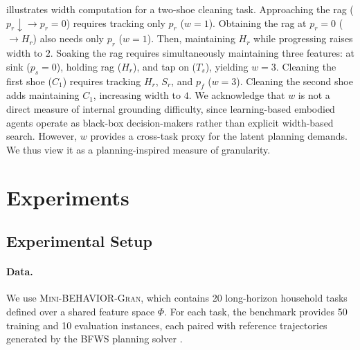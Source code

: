 \documentclass[11pt]{article}
\begin{document}


 illustrates width computation for a two-shoe cleaning task.  Approaching the rag ($p_r \downarrow \to p_r=0$) requires tracking only $p_r$ ($w=1$). Obtaining the rag at $p_r=0$ ($\to H_r$) also needs only $p_r$ ($w=1$). Then, maintaining $H_r$ while progressing raises width to $2$. Soaking the rag requires simultaneously maintaining three features: at sink ($p_s=0$), holding rag ($H_r$), and tap on ($T_s$), yielding $w=3$. Cleaning the first shoe ($C_1$) requires tracking $H_r$, $S_r$, and $p_f$ ($w=3$). Cleaning the second shoe adds maintaining $C_1$, increasing width to $4$. We acknowledge that $w$ is not a direct measure of internal grounding difficulty, since learning-based embodied agents operate as black-box decision-makers rather than explicit width-based search. However, $w$ provides a cross-task proxy for the latent planning demands. We thus view it as a planning-inspired measure of granularity.

\section{Experiments}

\subsection{Experimental Setup}

\paragraph{Data.}
We use \textsc{Mini-BEHAVIOR-Gran}, which contains 20 long-horizon household tasks defined over a shared feature space $\Phi$. 
For each task, the benchmark provides 50 training and 10 evaluation instances, each paired with reference trajectories generated by the \textsc{BFWS} planning solver \citep{DBLP:conf/aaai/LipovetzkyG17}.
\end{document}
